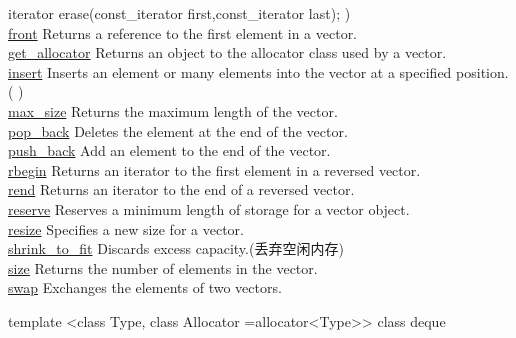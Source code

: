 {{iterator erase(const_iterator first,const_iterator last);} ) \\
\underline{front}	Returns a reference to the first element in a vector.\\
\underline{get_allocator}	Returns an object to the allocator class used by a vector.\\
\underline{insert}	Inserts an element or many elements into the vector at a specified position.(  )\\
\underline{max_size}	Returns the maximum length of the vector.\\
\underline{pop_back}	Deletes the element at the end of the vector.\\
\underline{push_back}	Add an element to the end of the vector.\\
\underline{rbegin}	Returns an iterator to the first element in a reversed vector.\\
\underline{rend}	Returns an iterator to the end of a reversed vector.\\
\underline{reserve}	Reserves a minimum length of storage for a vector object.\\
\underline{resize}	Specifies a new size for a vector.\\
\underline{shrink_to_fit}	Discards excess capacity.(丢弃空闲内存)\\
\underline{size} Returns the number of elements in the vector.\\
\underline{swap}	Exchanges the elements of two vectors.\\
}


\Dl


\begin{NoteCode}
template <class Type, class Allocator =allocator<Type>>
class deque
\end{NoteCode}

